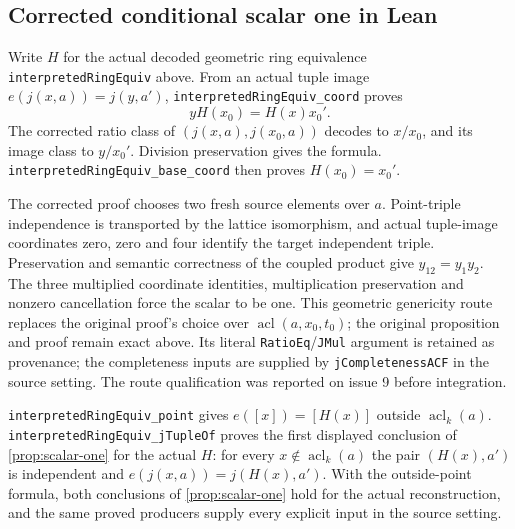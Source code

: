 \documentclass[11pt,oneside]{article}
\theoremstyle{definition}
\theoremstyle{remark}
\newcommand{\acl}{\operatorname{acl}}
\newcommand{\lean}[1]{\nolinkurl{#1}}
\begin{document}
\subsection{Corrected conditional scalar one in Lean}

Write $H$ for the actual decoded geometric ring equivalence
\lean{interpretedRingEquiv} above. From an actual tuple image $e(j(x,a))=j(y,a')$,
\lean{interpretedRingEquiv_coord} proves
\[
 yH(x_0)=H(x)x_0'.
\]
The corrected ratio class of $(j(x,a),j(x_0,a))$ decodes to $x/x_0$,
and its image class to $y/x_0'$. Division preservation gives the formula.
\lean{interpretedRingEquiv_base_coord} then proves $H(x_0)=x_0'$.

The corrected proof chooses two fresh source elements over $a$. Point-triple
independence is transported by the lattice isomorphism, and actual tuple-image
coordinates zero, zero and four identify the target independent triple.
Preservation and semantic correctness of the coupled product give
$y_{12}=y_1y_2$. The three multiplied coordinate identities, multiplication
preservation and nonzero cancellation force the scalar to be one.
This geometric genericity route replaces the original proof's choice over
$\acl(a,x_0,t_0)$; the original proposition and proof remain exact above.
Its literal \lean{RatioEq}/\lean{JMul} argument is retained as provenance; the
completeness inputs are supplied by \lean{jCompletenessACF} in the source setting.
The route qualification was reported on issue 9 before integration.

\lean{interpretedRingEquiv_point} gives $e([x])=[H(x)]$ outside $\acl_k(a)$.
\lean{interpretedRingEquiv_jTupleOf} proves the first displayed conclusion of
\cref{prop:scalar-one} for the actual $H$: for every $x\notin\acl_k(a)$ the pair
$(H(x),a')$ is independent and $e(j(x,a))=j(H(x),a')$. With the outside-point formula,
both conclusions of \cref{prop:scalar-one} hold for the actual reconstruction, and the
same proved producers supply every explicit input in the source setting.
\end{document}
